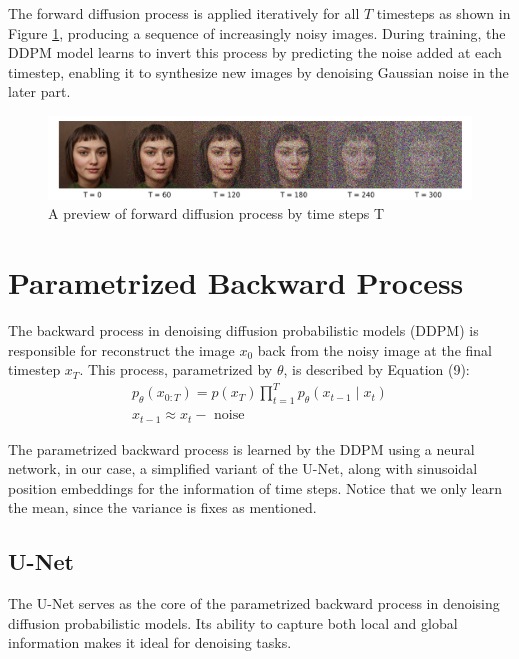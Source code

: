 \documentclass[letterpaper]{article} %
\begin{document}
The forward diffusion process is applied iteratively for all $T$ timesteps as shown in Figure \ref{fig:figure2}, producing a sequence of increasingly noisy images. During training, the DDPM model learns to invert this process by predicting the noise added at each timestep, enabling it to synthesize new images by denoising Gaussian noise in the later part.

\begin{figure}[htbp]
    \centering
    \includegraphics[width=0.88\linewidth]{f2.png} %
    \caption{A preview of forward diffusion process by time steps T}
    \label{fig:figure2}
\end{figure}

\section{Parametrized Backward Process}
The backward process in denoising diffusion probabilistic models (DDPM) is responsible for reconstruct the image $x_0$ back from the noisy image at the final timestep $x_T$. This process, parametrized by $\theta$, is described by Equation (9):
\begin{equation}
\begin{aligned}
p_\theta\left(x_{0: T}\right)=p\left(x_T\right) \prod_{t=1}^T p_\theta\left(x_{t-1} \mid x_t\right)\\
x_{t-1} \approx x_t-\text { noise }
\end{aligned}
\end{equation}

The parametrized backward process is learned by the DDPM using a neural network, in our case, a simplified variant of the U-Net, along with sinusoidal position embeddings for the information of time steps. Notice that we only learn the mean, since the variance is fixes as mentioned.

\subsection{U-Net}
The U-Net serves as the core of the parametrized backward process in denoising diffusion probabilistic models. Its ability to capture both local and global information makes it ideal for denoising tasks.
\end{document}
